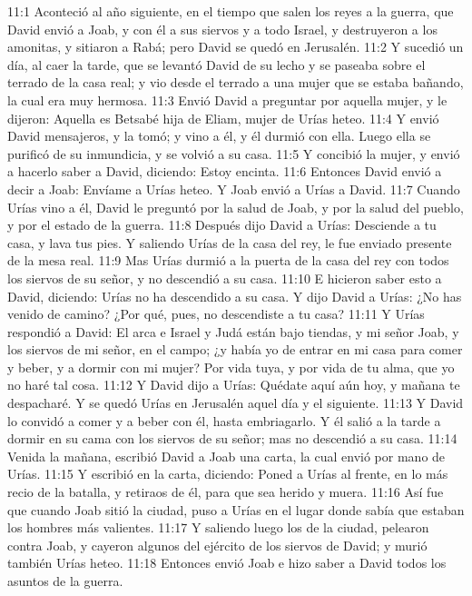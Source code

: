 11:1 Aconteció al año siguiente, en el tiempo que salen los reyes a la guerra, que David envió a Joab, y con él a sus siervos y a todo Israel, y destruyeron a los amonitas, y sitiaron a Rabá; pero David se quedó en Jerusalén. 
11:2 Y sucedió un día, al caer la tarde, que se levantó David de su lecho y se paseaba sobre el terrado de la casa real; y vio desde el terrado a una mujer que se estaba bañando, la cual era muy hermosa.  
11:3 Envió David a preguntar por aquella mujer, y le dijeron: Aquella es Betsabé hija de Eliam, mujer de Urías heteo.  
11:4 Y envió David mensajeros, y la tomó; y vino a él, y él durmió con ella. Luego ella se purificó de su inmundicia, y se volvió a su casa.  
11:5 Y concibió la mujer, y envió a hacerlo saber a David, diciendo: Estoy encinta.  
11:6 Entonces David envió a decir a Joab: Envíame a Urías heteo. Y Joab envió a Urías a David.  
11:7 Cuando Urías vino a él, David le preguntó por la salud de Joab, y por la salud del pueblo, y por el estado de la guerra.  
11:8 Después dijo David a Urías: Desciende a tu casa, y lava tus pies. Y saliendo Urías de la casa del rey, le fue enviado presente de la mesa real.  
11:9 Mas Urías durmió a la puerta de la casa del rey con todos los siervos de su señor, y no descendió a su casa.  
11:10 E hicieron saber esto a David, diciendo: Urías no ha descendido a su casa. Y dijo David a Urías: ¿No has venido de camino? ¿Por qué, pues, no descendiste a tu casa?  
11:11 Y Urías respondió a David: El arca e Israel y Judá están bajo tiendas, y mi señor Joab, y los siervos de mi señor, en el campo; ¿y había yo de entrar en mi casa para comer y beber, y a dormir con mi mujer? Por vida tuya, y por vida de tu alma, que yo no haré tal cosa.  
11:12 Y David dijo a Urías: Quédate aquí aún hoy, y mañana te despacharé. Y se quedó Urías en Jerusalén aquel día y el siguiente.  
11:13 Y David lo convidó a comer y a beber con él, hasta embriagarlo. Y él salió a la tarde a dormir en su cama con los siervos de su señor; mas no descendió a su casa.  
11:14 Venida la mañana, escribió David a Joab una carta, la cual envió por mano de Urías.  
11:15 Y escribió en la carta, diciendo: Poned a Urías al frente, en lo más recio de la batalla, y retiraos de él, para que sea herido y muera.  
11:16 Así fue que cuando Joab sitió la ciudad, puso a Urías en el lugar donde sabía que estaban los hombres más valientes.  
11:17 Y saliendo luego los de la ciudad, pelearon contra Joab, y cayeron algunos del ejército de los siervos de David; y murió también Urías heteo.  
11:18 Entonces envió Joab e hizo saber a David todos los asuntos de la guerra.  
